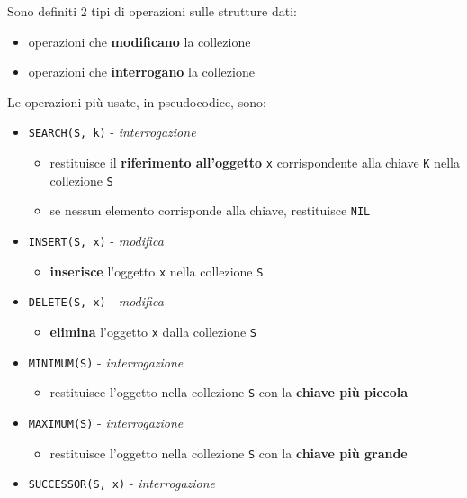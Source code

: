 \documentclass[italian, 10pt]{article}
\begin{document}
Sono definiti \(2\) tipi di operazioni sulle strutture dati:

\begin{itemize}
  \item operazioni che \textbf{modificano} la collezione
  \item operazioni che \textbf{interrogano} la collezione
\end{itemize}

\bigskip
Le operazioni più usate, in pseudocodice, sono:

\begin{itemize}
  \item \texttt{SEARCH(S, k)} - \textit{interrogazione}
        \begin{itemize}
          \item restituisce il \textbf{riferimento all'oggetto} \texttt{x} corrispondente alla chiave \texttt{K} nella collezione \texttt{S}
          \item se nessun elemento corrisponde alla chiave, restituisce \texttt{NIL}
        \end{itemize}
  \item \texttt{INSERT(S, x)} - \textit{modifica}
        \begin{itemize}
          \item \textbf{inserisce} l'oggetto \texttt{x} nella collezione \texttt{S}
        \end{itemize}
  \item \texttt{DELETE(S, x)} - \textit{modifica}
        \begin{itemize}
          \item \textbf{elimina} l'oggetto \texttt{x} dalla collezione \texttt{S}
        \end{itemize}
  \item \texttt{MINIMUM(S)} - \textit{interrogazione}
        \begin{itemize}
          \item restituisce l'oggetto nella collezione \texttt{S} con la \textbf{chiave più piccola}
        \end{itemize}
  \item \texttt{MAXIMUM(S)} - \textit{interrogazione}
        \begin{itemize}
          \item restituisce l'oggetto nella collezione \texttt{S} con la \textbf{chiave più grande}
        \end{itemize}
  \item \texttt{SUCCESSOR(S, x)} - \textit{interrogazione}

\end{itemize}
\end{document}
